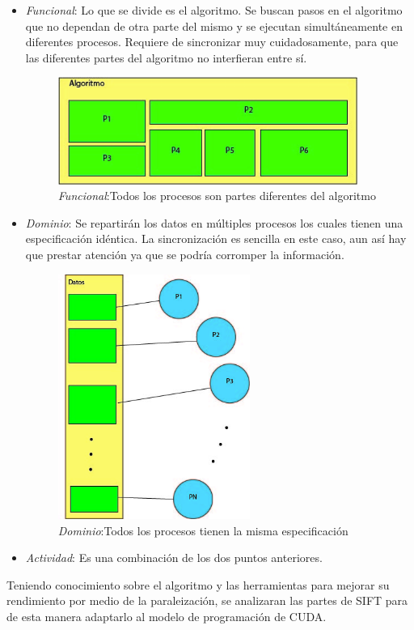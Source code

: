 \begin{itemize}
	\item \textit{Funcional}: Lo que se divide es el algoritmo. Se buscan pasos en el algoritmo que no dependan de otra parte del mismo y se ejecutan simultáneamente en diferentes procesos. Requiere de sincronizar muy cuidadosamente, para que las diferentes partes del algoritmo no interfieran entre sí. 
	 \begin{figure}[H]
	 		\centering
	 			\includegraphics[height=3.5cm]{img/funcional.jpg}
	 		\caption{\textit{Funcional}:Todos los procesos son partes diferentes del algoritmo}
	 \end{figure}
	\item \textit{Dominio}: Se repartirán los datos en múltiples procesos los cuales tienen una especificación idéntica. La sincronización es sencilla en este caso, aun así hay que prestar atención ya que se podría corromper la información.
	 \begin{figure}[H]
	 		\centering
				\includegraphics[height=8cm]{img/dominio.jpg}
	 		\caption{\textit{Dominio}:Todos los procesos tienen la misma especificación}
	 \end{figure}
	\item 	\textit{Actividad}: Es una combinación de los dos puntos anteriores.
\end{itemize}
Teniendo conocimiento sobre el algoritmo y las herramientas para mejorar su rendimiento por medio de la paraleización, se analizaran las partes de SIFT para de esta manera adaptarlo al modelo de programación de CUDA.
